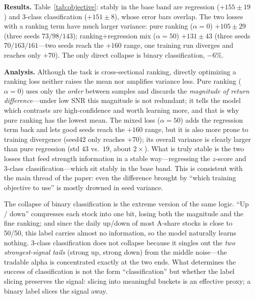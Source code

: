 \documentclass[a4paper,11pt]{article}
\begin{document}
\textbf{Results.} Table~\ref{tab:objective}: stably in the base band are
regression ($+155\pm19$) and 3-class classification ($+151\pm8$), whose error
bars overlap. The two losses with a ranking term have much larger variance:
pure ranking ($\alpha{=}0$) $+105\pm29$ (three seeds $73 / 98 / 143$);
ranking$+$regression mix ($\alpha{=}50$) $+131\pm43$ (three seeds
$70 / 163 / 161$---two seeds reach the $+160$ range, one training run diverges
and reaches only $+70$). The only direct collapse is binary classification,
$-6\%$.

\textbf{Analysis.} Although the task is cross-sectional ranking,
directly optimizing a ranking loss neither raises the mean nor amplifies
variance less. Pure ranking ($\alpha{=}0$) uses only the \emph{order} between
samples and discards the \emph{magnitude of return difference}---under low SNR
this magnitude is not redundant; it tells the model which contrasts are
high-confidence and worth learning more, and that is why pure ranking has the
lowest mean. The mixed loss ($\alpha{=}50$) adds the regression term back and
lets good seeds reach the $+160$ range, but it is also more prone to training
divergence (seed42 only reaches $+70$); its overall variance is clearly larger
than pure regression (std $43$ vs.\ $19$, about $2\times$). What is truly stable
is the two losses that feed strength information in a stable way---regressing
the $z$-score and 3-class classification---which sit stably in the base band.
This is consistent with the main thread of the paper: even the difference
brought by ``which training objective to use'' is mostly drowned in seed
variance.

The collapse of binary classification is the extreme version of the same
logic. ``Up / down'' compresses each stock into one bit, losing both the
magnitude and the fine ranking; and since the daily up/down of most A-share
stocks is close to 50/50, this label carries almost no information, so the
model naturally learns nothing. 3-class classification does not collapse
because it singles out the \emph{two strongest-signal tails} (strong up, strong
down) from the middle noise---the tradable alpha is concentrated exactly at the
two ends. What determines the success of classification is not the form
``classification'' but whether the label slicing preserves the signal: slicing
into meaningful buckets is an effective proxy; a binary label slices the signal
away.
\end{document}
